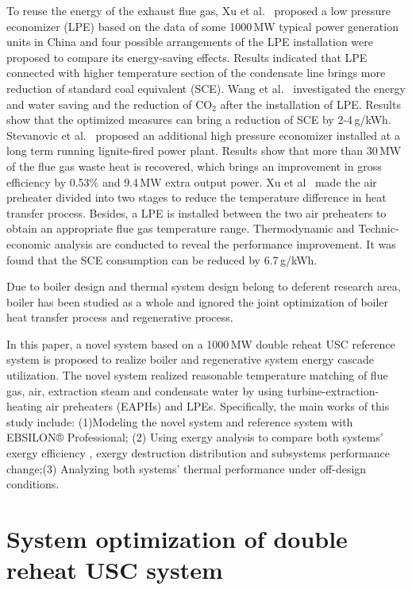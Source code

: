 \documentclass[preprint,12pt]{elsarticle}
\begin{document}
To reuse the energy of the exhaust flue gas, Xu et al.~\cite{Xu2013Techno} proposed a low pressure economizer (LPE) based on the data of some 1000\,MW typical power generation units in China and four possible arrangements of the LPE installation were proposed to compare its energy-saving effects.
Results indicated that LPE connected with higher temperature section of the condensate line brings more reduction of standard coal equivalent (SCE).
Wang et al.~\cite{Wang2012Application} investigated the energy and water saving and the reduction of CO$_2$ after the installation of LPE.
Results show that the optimized measures can bring a reduction of SCE by 2-4\,g/kWh.
Stevanovic et al.~\cite{Stevanovic2014Efficiency} proposed an additional high pressure economizer installed at a long term running lignite-fired power plant.
Results show that more than 30\,MW of the flue gas waste heat is recovered, which brings an improvement in gross efficiency by 0.53\% and 9.4\,MW extra output power.
Xu et al~\cite{Xu2013A} made the air preheater divided into two stages to reduce the temperature difference in heat transfer process.
Besides, a LPE is installed between the two air preheaters to obtain an appropriate flue gas temperature range.
Thermodynamic and Technic-economic analysis are conducted to reveal the performance improvement.
It was found that the SCE consumption can be reduced by 6.7\,g/kWh. 

Due to  boiler design and thermal system design belong to deferent research area, boiler has been studied as a whole and ignored the joint optimization of boiler heat transfer process and regenerative process.

In this paper, a novel system based on a 1000\,MW double reheat USC reference system  is proposed to realize boiler and regenerative system energy cascade utilization. 
The novel system realized reasonable temperature matching of flue gas, air, extraction steam and condensate water by using turbine-extraction-heating air preheaters (EAPHs) and LPEs.
Specifically, the main works of this study include: (1)Modeling the novel system and reference system with EBSILON® Professional; (2) Using exergy analysis to compare both systems' exergy efficiency , exergy destruction distribution and subsystems performance change;(3) Analyzing both systems' thermal performance under off-design conditions.



\section{System optimization of double reheat USC system}
\label{sec2:system intro}
\end{document}
